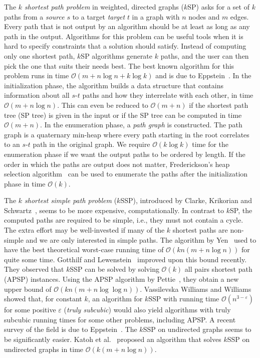 \documentclass[runningheads,a4paper]{llncs}
\begin{document}
The \emph{$k$ shortest path problem} in weighted, directed graphs ($k$SP) asks for a set of $k$ paths from a \emph{source} $s$ to a target \emph{target} $t$ in a graph with $n$ nodes and $m$ edges.
Every path that is not output by an algorithm should be at least as long as any path in the output.
Algorithms for this problem can be useful tools when it is hard to specify constraints that a solution should satisfy.
Instead of computing only one shortest path, $k$SP algorithms generate $k$ paths, and the user can then pick the one that suits their needs best.
The best known algorithm for this problem runs in time $\mathcal O(m + n \log n + k \log k)$ and is due to Eppstein~\cite{DBLP:journals/siamcomp/Eppstein98}.
In the initialization phase, the algorithm builds a data structure that contains information about all $s$-$t$ paths and how they interrelate with each other, in time $\mathcal O(m + n \log n)$.
This can even be reduced to $\mathcal O(m + n)$ if the shortest path tree (SP tree) is given in the input or if the SP tree can be computed in time $\mathcal O(m + n)$.
In the enumeration phase, a \emph{path graph} is constructed.
The path graph is a quaternary min-heap where every path starting in the root correlates to an $s$-$t$ path in the original graph.
We require $\mathcal O(k \log k)$ time for the enumeration phase if we want the output paths to be ordered by length.
If the order in which the paths are output does not matter, Frederickson's heap selection algorithm~\cite{DBLP:journals/iandc/Frederickson93} can be used to enumerate the paths after the initialization phase in time $\mathcal O(k)$.

The \emph{$k$ shortest simple path problem} ($k$SSP), introduced by Clarke, Krikorian and Schwartz~\cite{CUSTOM:journals/jsiam/ClarkeKR63}, seems to be more expensive, computationally.
In contrast to $k$SP, the computed paths are required to be simple, i.e., they must not contain a cycle.
The extra effort may be well-invested if many of the $k$ shortest paths are non-simple and we are only interested in simple paths.
The algorithm by Yen~\cite{CUSTOM:journals/networks/Yen71} used to have the best theoretical worst-case running time of $\mathcal O(kn(m + n \log n))$ for quite some time.
Gotthilf and Lewenstein~\cite{DBLP:journals/ipl/GotthilfL09} improved upon this bound recently.
They observed that $k$SSP can be solved by solving $\mathcal O(k)$ all pairs shortest path (APSP) instances.
Using the APSP algorithm by Pettie~\cite{DBLP:journals/tcs/Pettie04}, they obtain a new upper bound of $\mathcal O(kn(m + n \log \log n))$.
Vassilevska Williams and Williams~\cite{DBLP:conf/focs/WilliamsW10} showed that, for constant $k$, an algorithm for $k$SSP with running time $\mathcal O(n^{3-\varepsilon})$ for some positive $\varepsilon$ (\emph{truly subcubic}) would also yield algorithms with truly subcubic running times for some other problems, including APSP.
A recent survey of the field is due to Eppstein~\cite{CUSTOM:arxiv/Eppstein14}.
The $k$SSP on undirected graphs seems to be significantly easier.
Katoh et al.~\cite{DBLP:journals/networks/KatohIM82} proposed an algorithm that solves $k$SSP on undirected graphs in time $\mathcal O(k(m + n \log n))$.
\end{document}
